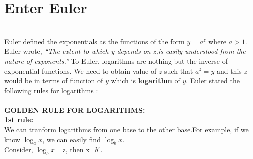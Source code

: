 \documentclass[a4paper,reqno,11pt]{book}
\theoremstyle{plain}%
\theoremstyle{definition}
\begin{document}
\section{Enter Euler}
\\
Euler defined the exponentials as the functions 
of the form $y = a^z$ where $a>1.$
Euler wrote,
\textit{``The extent to which y depends on z,is easily understood from 
the nature of exponents.''}
To Euler, logarithms are nothing but the inverse of exponential functions.
We need to obtain value of $z$ such that $a^z = y$ and this $z$ would be in terms of function of $y$ which is \textbf{logarithm} of $y$. Euler stated the following rules for logarithms :\\
\\
\textbf{GOLDEN RULE FOR LOGARITHMS:}\\
\textbf{1st rule:}\\
We can tranform logarithms from one base to the other base.For example, if we know $\log_ax$, we can easily find $\log_bx$.\\
Consider, $\log_bx$= z, then x=$b^z$.\\
\end{document}
